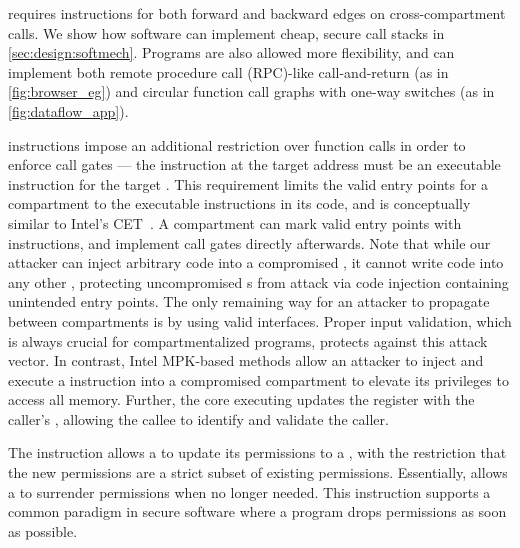 \seccells requires \sdswitch instructions for both
forward and backward edges on cross-compartment calls.
We show how software can implement cheap, secure call
stacks in \autoref{sec:design:softmech}.
Programs are also allowed more flexibility, and can implement
both remote procedure call (RPC)-like call-and-return (as in
\autoref{fig:browser_eg})
and circular function call graphs with one-way switches 
(as in \autoref{fig:dataflow_app}).

\sdswitch instructions impose an additional
restriction over function calls in order to enforce call gates --- 
the instruction at the target address must be
an executable \sdentry instruction for the target \secdiv.
This requirement limits the valid entry points for a compartment
to the executable \sdentry instructions in its code, 
and is conceptually similar to Intel's CET~\cite{intelCET}.
A compartment can mark valid entry points with \sdentry 
instructions, and implement call gates directly afterwards.
Note that while our attacker can inject arbitrary code into a
compromised \secdiv, it cannot write code into
any other \secdiv, protecting uncompromised \secdiv{}s from 
attack via code injection containing unintended entry points.
The only remaining way for an attacker to propagate between 
compartments is by using valid interfaces.
Proper input validation, which is always crucial for 
compartmentalized programs, protects against this attack vector.
In contrast, Intel MPK-based methods allow an attacker to
inject and execute a  instruction into a compromised 
compartment to elevate its privileges to access all memory.
Further, the core executing \sdswitch updates the \rid
register with the caller's \sid,
allowing the callee to identify and validate the caller.

The \scprot instruction allows a \secdiv to update
its permissions to a \cell, with the restriction that the
new permissions are a strict subset of existing permissions.
Essentially, \scprot allows a \secdiv to surrender permissions
when no longer needed.
This instruction supports a common paradigm in secure software
where a program drops permissions as soon as possible.

